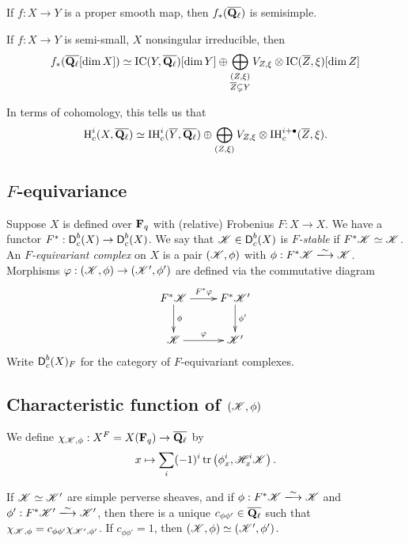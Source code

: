 \documentclass{article}
\begin{document}
\begin{theorem}
If $f:X\to Y$ is a proper smooth map, then 
$f_\ast(\overline{\mathbf{Q}_\ell})$ is semisimple. 
\end{theorem}

\begin{corollary}
If $f:X\to Y$ is semi-small, $X$ nonsingular irreducible, then 
\[
  f_\ast(\overline{\mathbf{Q}_\ell}[\dim X]) \simeq \operatorname{IC}(Y,\overline{\mathbf{Q}_\ell})[\dim Y]\oplus \bigoplus_{\substack{(Z,\xi) \\ \overline Z\subsetneq Y}} V_{Z,\xi} \otimes \operatorname{IC}(\overline Z,\xi)[\dim Z] 
\]
\end{corollary}

In terms of cohomology, this tells us that 
\[
  \operatorname{H}_c^i(X,\overline{\mathbf{Q}_\ell}) \simeq \operatorname{IH}_c^i(\overline Y,\overline{\mathbf{Q}_\ell}) \oplus \bigoplus_{(Z,\xi)} V_{Z,\xi} \otimes \operatorname{IH}_c^{i+\bullet}(\overline Z,\xi) .
\]


\subsection{\texorpdfstring{$F$}{F}-equivariance}

Suppose $X$ is defined over $\mathbf{F}_q$ with (relative) Frobenius 
$F:X\to X$. We have a functor $F^\ast:\operatorname{\mathsf{D}}_c^b(X) \to \operatorname{\mathsf{D}}_c^b(X)$. 
We say that $\mathscr{K}\in \operatorname{\mathsf{D}}_c^b(X)$ is \emph{$F$-stable} if 
$F^\ast \mathscr{K}\simeq \mathscr{K}$. An \emph{$F$-equivariant complex} on $X$ is a pair 
$(\mathscr{K},\phi)$ with $\phi:F^\ast \sK\isomorphism \sK$. Morphisms 
$\varphi:(\mathscr{K},\phi) \to (\mathscr{K}',\phi')$ are defined via the commutative diagram 
\[\xymatrix{
  F^\ast \sK \ar[r]^-{F^\ast\varphi} \ar[d]^-\phi 
    & F^\ast \sK' \ar[d]^-{\phi'} \\
  \sK \ar[r]^-\varphi 
    & \sK' 
}\]
Write $\operatorname{\mathsf{D}}_c^b(X)_F$ for the category of $F$-equivariant complexes. 


\subsection{Characteristic function of \texorpdfstring{$(\mathscr{K},\phi)$}{(K,phi)}}

We define $\chi_{\mathscr{K},\phi}:X^F=X(\mathbf{F}_q) \to \overline{\mathbf{Q}_\ell}$ by 
\[
  x\mapsto \sum_i (-1)^i \operatorname{tr}\left(\phi_x^i, \mathscr{H}_x^i\mathscr{K}\right) .
\]

\begin{lemma}
If $\mathscr{K}\simeq \mathscr{K}'$ are simple perverse sheaves, and if 
$\phi:F^\ast\sK \isomorphism \sK$ and $\phi':F^\ast \sK'\isomorphism \sK'$, 
then there is a unique $c_{\phi\phi'}\in \overline{\mathbf{Q}_\ell}$ such that 
$\chi_{\mathscr{K},\phi} = c_{\phi\phi'} \chi_{\mathscr{K}',\phi'}$. If 
$c_{\phi\phi'}=1$, then $(\mathscr{K},\phi)\simeq (\mathscr{K}',\phi')$. 
\end{lemma}
\end{document}
